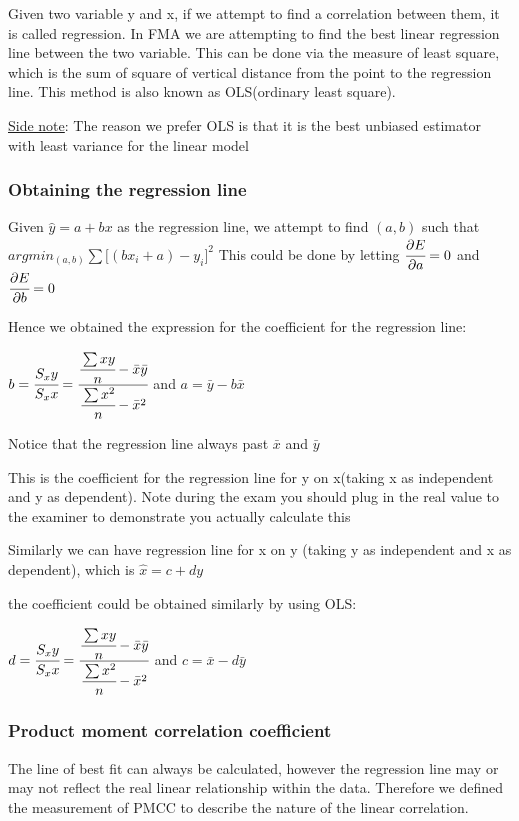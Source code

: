\documentclass[]{article}
\begin{document}
Given two variable y and x, if we attempt to find a correlation between
them, it is called regression. In FMA we are attempting to find the best
linear regression line between the two variable. This can be done via
the measure of least square, which is the sum of square of vertical
distance from the point to the regression line. This method is also
known as OLS(ordinary least square).

\href{}{Side note}: The reason we prefer OLS is that it is the best
unbiased estimator with least variance for the linear model

\subsubsection{Obtaining the regression line}\label{header-n339}

Given \(\hat{y} = a +bx\) as the regression line, we attempt to find
\((a,b)\) such that \(argmin_{(a,b)} \sum{[(b x_i + a)-y_i}]^2\) This
could be done by letting \(\cfrac{\partial E}{\partial a} = 0\) and
\(\cfrac{\partial E}{\partial b} = 0\)

Hence we obtained the expression for the coefficient for the regression
line:

\(b = \cfrac{S_xy}{S_xx} = \cfrac{\cfrac{\sum xy}{n} - \bar{x}\bar{y}}{\cfrac{\sum x^2}{n}-\bar{x}^2}\)
and \(a = \bar{y} - b\bar{x}\)

Notice that the regression line always past \(\bar{x}\) and \(\bar{y}\)

This is the coefficient for the regression line for y on x(taking x as
independent and y as dependent). Note during the exam you should plug in
the real value to the examiner to demonstrate you actually calculate
this

Similarly we can have regression line for x on y (taking y as
independent and x as dependent), which is \(\hat{x} = c + dy\)

the coefficient could be obtained similarly by using OLS:

\(d = \cfrac{S_xy}{S_xx} = \cfrac{\cfrac{\sum xy}{n} - \bar{x}\bar{y}}{\cfrac{\sum x^2}{n}-\bar{x}^2}\)
and \(c = \bar{x} - d\bar{y}\)

\subsubsection{Product moment correlation
coefficient}\label{header-n348}

The line of best fit can always be calculated, however the regression
line may or may not reflect the real linear relationship within the
data. Therefore we defined the measurement of PMCC to describe the
nature of the linear correlation.
\end{document}
